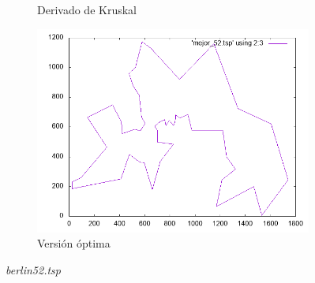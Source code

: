 \documentclass[12pt,spanish]{article}
\begin{document}
\begin{figure}[H]
\begin{subfigure}[b]{0.36\textwidth}
\caption{Derivado de Kruskal}
\end{subfigure}
\quad
\begin{subfigure}[b]{0.36\textwidth}
\includegraphics[width=\textwidth]{berlin52_mejor.png}
\caption{Versión óptima}
\end{subfigure}
\caption{\textit{berlin52.tsp}}
\end{figure}
\end{document}
